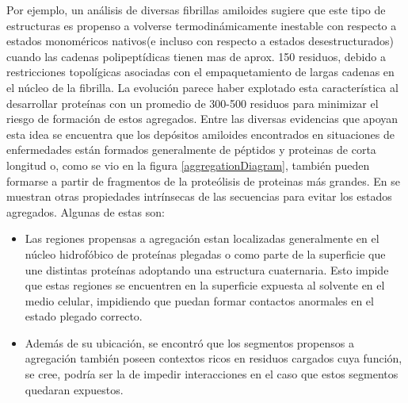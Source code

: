 Por ejemplo, un análisis de diversas fibrillas amiloides sugiere que este tipo de estructuras es propenso a volverse termodinámicamente inestable con respecto a estados monoméricos nativos(e incluso con respecto a estados desestructurados)
cuando las cadenas polipeptídicas tienen mas de aprox. 150 residuos, debido a restricciones topolígicas asociadas con el empaquetamiento de largas cadenas en el núcleo de la fibrilla\cite{baldwin2011metastability}.
La evolución parece haber explotado esta característica al desarrollar proteínas con un promedio de 300-500 residuos para minimizar el riesgo de formación de estos agregados.
Entre las diversas evidencias que apoyan esta idea se encuentra que los depósitos amiloides encontrados en situaciones de enfermedades 
están formados generalmente de péptidos y proteinas de corta longitud o, como se vio en la figura \ref{aggregationDiagram}, también pueden formarse a partir de fragmentos de la proteólisis de proteinas más grandes.
En \cite{knowles2014amyloid} se muestran otras propiedades intrínsecas de las secuencias para evitar los estados agregados. 
Algunas de estas son:
\begin{itemize}
 \item Las regiones propensas a agregación estan localizadas generalmente en el núcleo hidrofóbico de proteínas plegadas o como parte de la superficie que une distintas proteínas adoptando una estructura cuaternaria.
 Esto impide que estas regiones se encuentren en la superficie expuesta al solvente en el medio celular, impidiendo que puedan formar contactos anormales en el estado plegado correcto. 

\item Además de su ubicación, se encontró que los segmentos propensos a agregación también poseen contextos ricos en residuos cargados cuya función, se cree, podría ser la de impedir interacciones en el caso que 
estos segmentos quedaran expuestos.


\end{itemize}



